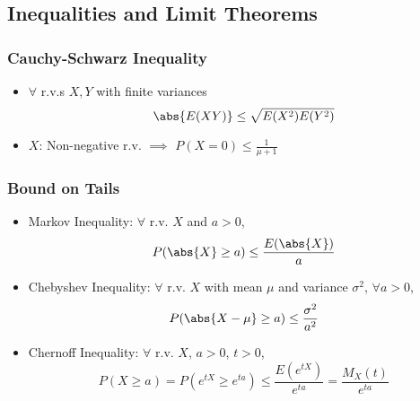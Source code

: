\subsection{Inequalities and Limit Theorems}

\subsubsection*{Cauchy-Schwarz Inequality}
\begin{itemize}
    \item $\forall$ r.v.s $X,Y$ with finite variances
    \begin{equation}
        \abs{E(XY)}\leq\sqrt{E(X^2)E(Y^2)}
    \end{equation}
    \item $X$: Non-negative r.v. $\implies$ $P(X=0)\leq\frac{1}{\mu+1}$
\end{itemize}

\subsubsection*{Bound on Tails}
\begin{itemize}
    \item Markov Inequality: $\forall$ r.v. $X$ and $a>0$,
    \begin{equation}
        P(\abs{X}\geq a)\leq\frac{E(\abs{X})}{a}
    \end{equation}
    \item Chebyshev Inequality: $\forall$ r.v. $X$ with mean $\mu$ and variance $\sigma^2$, $\forall a>0$,
    \begin{equation}
        P(\abs{X-\mu}\geq a)\leq\frac{\sigma^2}{a^2}
    \end{equation}
    \item Chernoff Inequality: $\forall$ r.v. $X$, $a>0$, $t>0$,
    \begin{equation}
        P(X\geq a)=P\left(e^{tX}\geq e^{ta}\right)\leq\frac{E\left(e^{tX}\right)}{e^{ta}}=\frac{M_X(t)}{e^{ta}}
    \end{equation}
\end{itemize}

